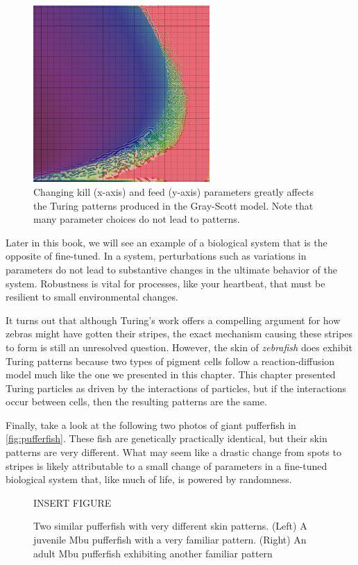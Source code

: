 \begin{figure}[h]
\centering
\mySfFamily
\includegraphics[width = 0.6\textwidth]{../images/xmorphia-parameter-map.jpg}
\caption{Changing kill (x-axis) and feed (y-axis) parameters greatly affects the Turing patterns produced in the Gray-Scott model. Note that many parameter choices do not lead to patterns.}
\label{fig:xmorphia-parameter-map}
\end{figure}

Later in this book, we will see an example of a biological system that is the opposite of fine-tuned. In a  system, perturbations such as variations in parameters do not lead to substantive changes in the ultimate behavior of the system. Robustness is vital for processes, like your heartbeat, that must be resilient to small environmental changes.

It turns out that although Turing's work offers a compelling argument for how zebras might have gotten their stripes, the exact mechanism causing these stripes to form is still an unresolved question. However, the skin of \textit{zebrafish} does exhibit Turing patterns because two types of pigment cells follow a reaction-diffusion model much like the one we presented in this chapter. This chapter presented Turing particles as driven by the interactions of particles, but if the interactions occur between cells, then the resulting patterns are the same.

Finally, take a look at the following two photos of giant pufferfish in \autoref{fig:pufferfish}. These fish are genetically practically identical, but their skin patterns are very different. What may seem like a drastic change from spots to stripes is likely attributable to a small change of parameters in a fine-tuned biological system that, like much of life, is powered by randomness.\\

\begin{figure}[h]
\centering
\mySfFamily
INSERT FIGURE
\caption{Two similar pufferfish with very different skin patterns. (Left) A juvenile Mbu pufferfish with a very familiar pattern. (Right) An adult Mbu pufferfish exhibiting another familiar pattern}
\label{fig:pufferfish}
\end{figure}
